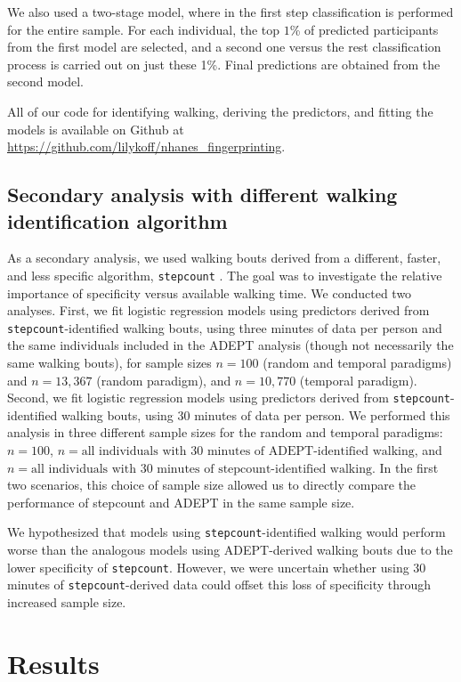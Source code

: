 We also used a two-stage model, where in the first step classification is performed for the entire sample. For each individual, the top $1$\% of predicted participants from the first model are selected, and a second one versus the rest classification process is carried out on just these 1\%. Final predictions are  obtained from the second model. 

All of our code for identifying walking, deriving the predictors, and fitting the models is available on Github at \url{https://github.com/lilykoff/nhanes_fingerprinting}.

\subsection{Secondary analysis with different walking identification algorithm}
As a secondary analysis, we used walking bouts derived from a different, faster, and less specific algorithm, \texttt{stepcount} \citep{stepcount}. The goal was to investigate the relative importance of specificity versus available walking time. We conducted two analyses. First, we fit logistic regression models using predictors derived from \texttt{stepcount}-identified walking bouts, using three minutes of data per person and the same individuals included in the ADEPT analysis (though not necessarily the same walking bouts), for sample sizes $n = 100$ (random and temporal paradigms) and $n = 13{,}367$ (random paradigm), and $n = 10{,}770$ (temporal paradigm). Second, we fit logistic regression models using predictors derived from \texttt{stepcount}-identified walking bouts, using 30 minutes of data per person. We performed this analysis in three different sample sizes for the random and temporal paradigms: $n = 100$, $n = \text{all individuals with 30 minutes of ADEPT-identified walking}$, and $n = \text{all individuals with 30 minutes of stepcount-identified walking}$. In the first two scenarios, this choice of sample size allowed us to directly compare the performance of stepcount and ADEPT in the same sample size.

We hypothesized that models using \texttt{stepcount}-identified walking would perform worse than the analogous models using ADEPT-derived walking bouts due to the lower specificity of \texttt{stepcount}. However, we were uncertain whether using 30 minutes of \texttt{stepcount}-derived data could offset this loss of specificity through increased sample size.

\section{Results}\label{sec:results3}
